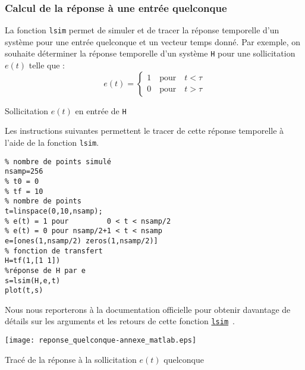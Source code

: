 \subsubsection{Calcul de la réponse à une entrée quelconque}
La fonction \texttt{lsim} permet de simuler et de tracer 
la réponse temporelle d'un système pour une entrée quelconque et un vecteur
temps donné. 
Par exemple, on souhaite déterminer la réponse temporelle 
d'un système \texttt{H} pour une sollicitation $e(t)$ telle que :
\[
    e(t)= \begin{cases}
        1\quad \textrm{pour}\quad t<\tau \\
        0\quad \textrm{pour}\quad t>\tau 
          \end{cases}
\]
\begin{marginfigure}
    \centering
    
    \caption{Sollicitation $e(t)$ en entrée de \texttt{H}}
\end{marginfigure}
Les instructions suivantes permettent le tracer de cette réponse temporelle
à l'aide de la fonction \texttt{lsim}.
\begin{verbatim}
% nombre de points simulé 
nsamp=256
% t0 = 0 
% tf = 10
% nombre de points 
t=linspace(0,10,nsamp);
% e(t) = 1 pour         0 < t < nsamp/2
% e(t) = 0 pour nsamp/2+1 < t < nsamp
e=[ones(1,nsamp/2) zeros(1,nsamp/2)] 
% fonction de transfert
H=tf(1,[1 1])
%réponse de H par e
s=lsim(H,e,t) 
plot(t,s)
\end{verbatim}
Nous nous reporterons à la documentation officielle pour obtenir davantage de
détails sur les arguments et les retours de cette fonction 
\href{https://fr.mathworks.com/help/control/ref/dynamicsystem.lsim.html}{\texttt{lsim}}~\cite{lsim}.
\begin{marginfigure}
    \centering
    \texttt{[image: reponse\_quelconque-annexe\_matlab.eps]}
    \caption{Tracé de la réponse à la sollicitation $e(t)$ quelconque}
\end{marginfigure}
\clearpage
\restoregeometry
\captionsetup{width=0.9\linewidth}
